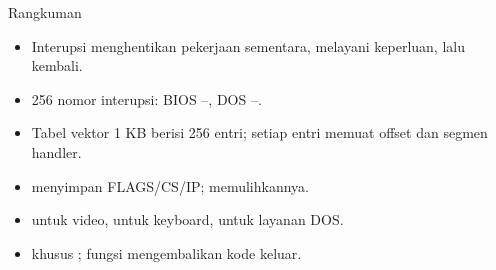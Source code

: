 \documentclass[aspectratio=169,11pt]{beamer}
\begin{document}
\begin{frame}{Rangkuman}
\small
\begin{itemize}
    \item Interupsi menghentikan pekerjaan sementara, melayani
          keperluan, lalu kembali.

    \vspace{0.15em}
    \item 256 nomor interupsi: BIOS --, DOS
          --.

    \vspace{0.15em}
    \item Tabel vektor 1 KB berisi 256 entri; setiap entri memuat
          offset dan segmen handler.

    \vspace{0.15em}
    \item {} menyimpan FLAGS/CS/IP; 
          memulihkannya.

    \vspace{0.15em}
    \item {} untuk video,  untuk
          keyboard,  untuk layanan DOS.

    \vspace{0.15em}
    \item {} khusus ; fungsi 
          mengembalikan kode keluar.
\end{itemize}
\end{frame}
\end{document}
